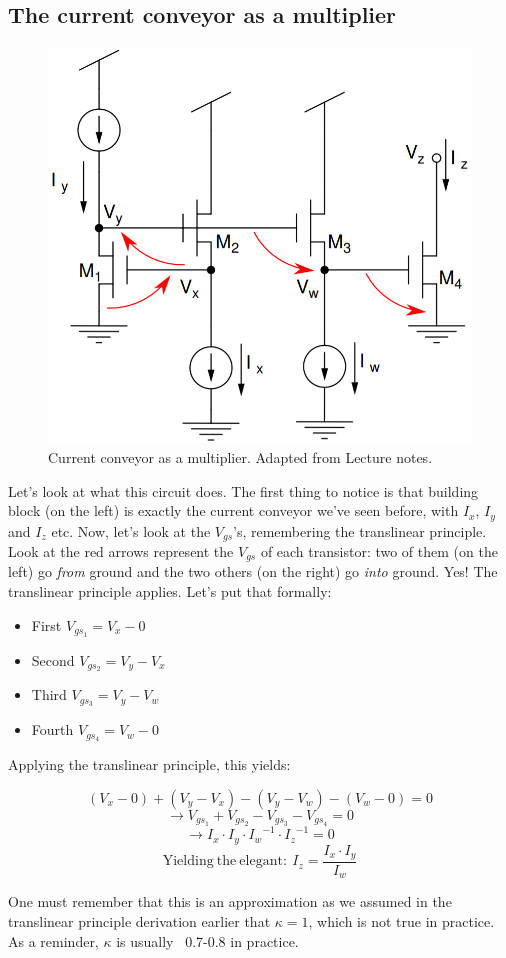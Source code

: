 \subsection{The current conveyor as a multiplier}

\begin{figure}[H]
    \centering
    \includegraphics[width=0.5\linewidth]{../../Figures/Current_Multiplier.PNG}
    \caption{Current conveyor as a multiplier. Adapted from Lecture notes.}
    \label{fig:Current_Multiplier}
\end{figure}

Let's look at what this circuit does. The first thing to notice is that building block (on the left) is exactly the current conveyor we've seen before, with $I_x$, $I_y$ and $I_z$ etc. Now, let's look at the $V_{gs}$'s, remembering the translinear principle. Look at the red arrows represent the $V_{gs}$ of each transistor: two of them (on the left) go \textit{from} ground and the two others (on the right) go \textit{into} ground. Yes! The translinear principle applies. Let's put that formally: 

\begin{itemize}
    \item First $V_{gs_1} = V_x - 0$
    \item Second $V_{gs_2} = V_y - V_x$
    \item Third $V_{gs_3} = V_y - V_w$
    \item Fourth $V_{gs_4} = V_w - 0$
\end{itemize}

Applying the translinear principle, this yields: 

\begin{equation}
    (V_x - 0) + (V_y - V_x) - (V_y - V_w) - (V_w - 0) = 0
\end{equation}
\begin{equation}
    \rightarrow V_{gs_1} + V_{gs_2} - V_{gs_3} - V_{gs_4} = 0
\end{equation}
\begin{equation}
    \rightarrow I_x \cdot I_y \cdot {I_w}^{-1} \cdot {I_z}^{-1}= 0
\end{equation}
\begin{equation}
    \mathrm{Yielding \ the \ elegant: }\ I_z = \frac{I_x \cdot I_y}{I_w} 
\end{equation}

One must remember that this is an approximation as we assumed in the translinear principle derivation earlier that $\kappa = 1$, which is not true in practice. As a reminder, $\kappa$ is usually ~0.7-0.8 in practice.  




